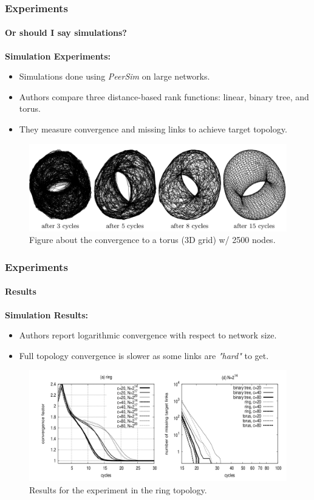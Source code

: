 \documentclass[10pt,    %
    english,            %
    xcolor=table,       %
    envcountsect,        %
    aspectratio=169     %
]{beamer}
\begin{document}
\begin{frame}
    \frametitle{Experiments}
    \framesubtitle{Or should I say simulations?}

    \textbf{Simulation Experiments:}
    \begin{itemize}
        \item Simulations done using \textit{PeerSim} on large networks.
        \item Authors compare three distance-based rank functions: linear, binary tree, and torus.
        \item They measure convergence and missing links to achieve target topology.
    \end{itemize}

    \begin{figure}[h!]
        \centering
        \includegraphics[width=.6\textwidth]{./images/convergence.png}
        \caption{Figure about the convergence to a torus (3D grid) w/ 2500 nodes.}
    \end{figure}
\end{frame}

\begin{frame}
    \frametitle{Experiments}
    \framesubtitle{Results}

    \textbf{Simulation Results:}
    \begin{itemize}
        \item Authors report logarithmic convergence with respect to network size.
        \item Full topology convergence is slower as some links are \textit{"hard"} to get.
    \end{itemize}

    \begin{figure}[h!]
        \centering
        \includegraphics[width=.6\textwidth]{./images/ring-results.png}
        \caption{Results for the experiment in the ring topology.}
    \end{figure}
\end{frame}
\end{document}

